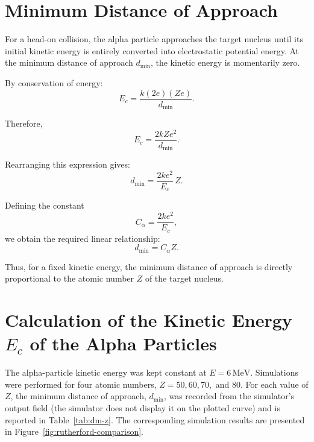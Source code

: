 \documentclass[12pt,a4paper,twoside]{article}
\begin{document}
\section{Minimum Distance of Approach}

For a head-on collision, the alpha particle approaches the target nucleus
until its initial kinetic energy is entirely converted into electrostatic
potential energy. At the minimum distance of approach $d_{\min}$, the kinetic
energy is momentarily zero.

By conservation of energy:
\begin{equation}
E_c = \frac{k(2e)(Ze)}{d_{\min}}.
\end{equation}

Therefore,
\begin{equation}
E_c = \frac{2kZe^2}{d_{\min}}.
\end{equation}

Rearranging this expression gives:
\begin{equation}
d_{\min} = \frac{2ke^2}{E_c}\,Z.
\end{equation}

Defining the constant
\begin{equation}
C_\alpha = \frac{2ke^2}{E_c},
\end{equation}
we obtain the required linear relationship:
\begin{equation}
\boxed{d_{\min} = C_\alpha Z}.
\end{equation}

Thus, for a fixed kinetic energy, the minimum distance of approach is
directly proportional to the atomic number $Z$ of the target nucleus.


\section{Calculation of the Kinetic Energy $E_c$ of the Alpha Particles}

The alpha-particle kinetic energy was kept constant at \(E = 6\,\mathrm{MeV}\).
Simulations were performed for four atomic numbers, \(Z = 50, 60, 70,\) and \(80\).
For each value of \(Z\), the minimum distance of approach, \(d_{\min}\), was
recorded from the simulator's output field (the simulator does not display it
on the plotted curve) and is reported in Table~\ref{tab:dm-z}. The corresponding
simulation results are presented in Figure~\ref{fig:rutherford-comparison}.
\end{document}
